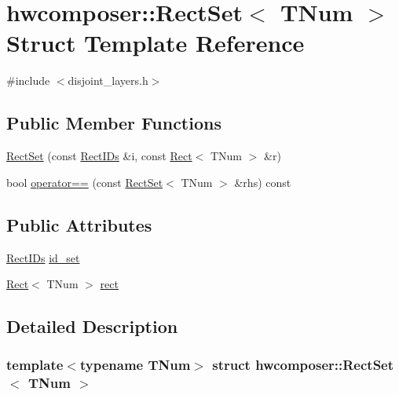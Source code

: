 \hypertarget{structhwcomposer_1_1RectSet}{}\section{hwcomposer\+:\+:Rect\+Set$<$ T\+Num $>$ Struct Template Reference}
\label{structhwcomposer_1_1RectSet}


{\ttfamily \#include $<$disjoint\+\_\+layers.\+h$>$}

\subsection*{Public Member Functions}
\begin{DoxyCompactItemize}
\item 
\mbox{\hyperlink{structhwcomposer_1_1RectSet_aac7c9adf4733e181912dcb3ae1125921}{Rect\+Set}} (const \mbox{\hyperlink{structhwcomposer_1_1RectIDs}{Rect\+I\+Ds}} \&i, const \mbox{\hyperlink{structhwcomposer_1_1Rect}{Rect}}$<$ T\+Num $>$ \&r)
\item 
bool \mbox{\hyperlink{structhwcomposer_1_1RectSet_a1f00bb9520861c8b73f2cde21a71b211}{operator==}} (const \mbox{\hyperlink{structhwcomposer_1_1RectSet}{Rect\+Set}}$<$ T\+Num $>$ \&rhs) const
\end{DoxyCompactItemize}
\subsection*{Public Attributes}
\begin{DoxyCompactItemize}
\item 
\mbox{\hyperlink{structhwcomposer_1_1RectIDs}{Rect\+I\+Ds}} \mbox{\hyperlink{structhwcomposer_1_1RectSet_ace46c21607523eca5345936ba743f28c}{id\+\_\+set}}
\item 
\mbox{\hyperlink{structhwcomposer_1_1Rect}{Rect}}$<$ T\+Num $>$ \mbox{\hyperlink{structhwcomposer_1_1RectSet_a7c8d95db3edda0fe888c524886426a2d}{rect}}
\end{DoxyCompactItemize}


\subsection{Detailed Description}
\subsubsection*{template$<$typename T\+Num$>$\newline
struct hwcomposer\+::\+Rect\+Set$<$ T\+Num $>$}



